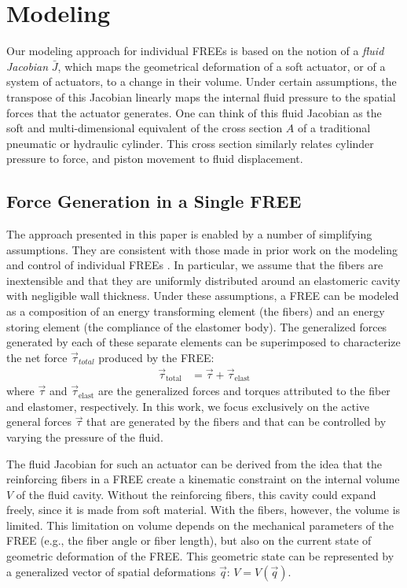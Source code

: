 \section{Modeling}
\label{sec:singleActuator}
%
Our modeling approach for individual FREEs is based on the notion of a \emph{fluid Jacobian} $\bar{J}$, which maps the geometrical deformation of a soft actuator, or of a system of actuators, to a change in their volume. 
Under certain assumptions, the transpose of this Jacobian linearly maps the internal fluid pressure to the spatial forces that the actuator generates. 
One can  think of this fluid Jacobian as the soft and multi-dimensional equivalent of the cross section $A$ of a traditional pneumatic or hydraulic cylinder.
This cross section similarly relates cylinder pressure to force, and piston movement to fluid displacement.


\subsection{Force Generation in a Single FREE}
%
The approach presented in this paper is enabled by a number of simplifying assumptions.
They are consistent with those made in prior work on the modeling and control of individual FREEs \cite{bishop2015design,bruder2017model}.
In particular, we assume that the fibers are inextensible and that they are uniformly  distributed  around  an elastomeric cavity  with negligible  wall thickness.
Under these assumptions, a FREE can be modeled as a composition of an energy transforming element (the fibers) and an energy storing element (the compliance of the elastomer body). 
The generalized forces generated by each of these separate elements can be superimposed to characterize the net force $\vec{\tau}_{total}$ produced by the FREE:
\begin{align}
   \vec{\tau}_{\text{total}} &=  \vec{\tau} + \vec{\tau}_{\text{elast}}    \label{eq:netF}
\end{align}
where $\vec{\tau}$ and $\vec{\tau}_{\text{elast}}$ are the generalized forces and torques attributed to the fiber and elastomer, respectively.
In this work, we focus exclusively on the active general forces $\vec{\tau}$ that are generated by the fibers and that can be controlled by varying the pressure of the fluid.


The fluid Jacobian for such an actuator can be derived from the idea that the reinforcing fibers in a FREE create a kinematic constraint on the internal volume $V$ of the fluid cavity.
Without the reinforcing fibers, this cavity could expand freely, since it is made from soft material.
With the fibers, however, the volume is limited.
This limitation on volume depends on the mechanical parameters of the FREE (e.g., the fiber angle or fiber length), but also on the current state of geometric deformation of the FREE.
This geometric state can be represented by a generalized vector of spatial deformations $\vec{q}$:  $V = V\left(\vec{q}\right)$.


